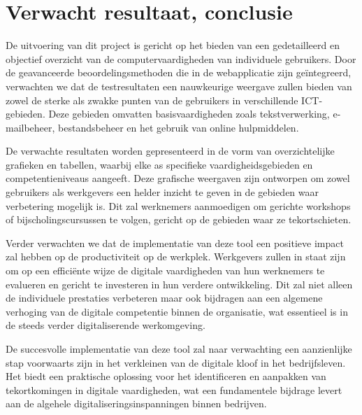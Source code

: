 \section{Verwacht resultaat, conclusie}%
\label{sec:verwachte_resultaten}




De uitvoering van dit project is gericht op het bieden van een gedetailleerd en objectief overzicht van de computervaardigheden van individuele gebruikers. Door de geavanceerde beoordelingsmethoden die in de webapplicatie zijn geïntegreerd, verwachten we dat de testresultaten een nauwkeurige weergave zullen bieden van zowel de sterke als zwakke punten van de gebruikers in verschillende ICT-gebieden. Deze gebieden omvatten basisvaardigheden zoals tekstverwerking, e-mailbeheer, bestandsbeheer en het gebruik van online hulpmiddelen.

De verwachte resultaten worden gepresenteerd in de vorm van overzichtelijke grafieken en tabellen, waarbij elke as specifieke vaardigheidsgebieden en competentieniveaus aangeeft. Deze grafische weergaven zijn ontworpen om zowel gebruikers als werkgevers een helder inzicht te geven in de gebieden waar verbetering mogelijk is. Dit zal werknemers aanmoedigen om gerichte workshops of bijscholingscursussen te volgen, gericht op de gebieden waar ze tekortschieten.

Verder verwachten we dat de implementatie van deze tool een positieve impact zal hebben op de productiviteit op de werkplek. Werkgevers zullen in staat zijn om op een efficiënte wijze de digitale vaardigheden van hun werknemers te evalueren en gericht te investeren in hun verdere ontwikkeling. Dit zal niet alleen de individuele prestaties verbeteren maar ook bijdragen aan een algemene verhoging van de digitale competentie binnen de organisatie, wat essentieel is in de steeds verder digitaliserende werkomgeving.

De succesvolle implementatie van deze tool zal naar verwachting een aanzienlijke stap voorwaarts zijn in het verkleinen van de digitale kloof in het bedrijfsleven. Het biedt een praktische oplossing voor het identificeren en aanpakken van tekortkomingen in digitale vaardigheden, wat een fundamentele bijdrage levert aan de algehele digitaliseringsinspanningen binnen bedrijven.